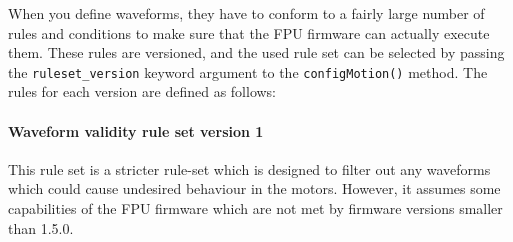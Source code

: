 \documentclass[11pt,a4paper]{report}
\begin{document}
When you define waveforms, they have to conform to a fairly large
number of rules and conditions to make sure that the FPU firmware can
actually execute them. These rules are versioned, and the used rule
set can be selected by passing the \texttt{ruleset\_version} keyword
argument to the \texttt{configMotion()} method.  The rules for each
version are defined as follows:

\paragraph{Waveform validity rule set version 1}

This rule set is a stricter rule-set which is designed to filter out
any waveforms which could cause undesired behaviour in the motors.
However, it assumes some capabilities of the FPU firmware which are
not met by firmware versions smaller than 1.5.0.
\end{document}
